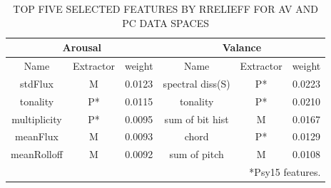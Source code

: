 \documentclass[journal, twoside]{IEEEtran}
\begin{document}
\bgroup
\def\arraystretch{1.4}
\begin{table}[ht]
    \centering
        \caption{TOP FIVE SELECTED FEATURES BY RRELIEFF FOR AV AND PC DATA SPACES}
        \label{table6}
    
    \begin{tabular}{ccc|ccc}
    \hline
\multicolumn{3}{c}{Arousal}       & \multicolumn{3}{c}{Valance}          \\ \hline
Name         & Extractor & weight & Name             & Extractor & weight \\ \hline
stdFlux      & M         & 0.0123 & spectral diss(S) & P*        & 0.0223 \\
tonality     & P*        & 0.0115 & tonality         & P*        & 0.0210 \\
multiplicity & P*        & 0.0095 & sum of bit hist  & M         & 0.0167 \\
meanFlux     & M         & 0.0093 & chord            & P*        & 0.0129 \\
meanRolloff  & M         & 0.0092 & sum of pitch     & M         & 0.0108\\ \hline \hline
 \multicolumn{6}{r}{*Psy15 features.}
\end{tabular}
\end{table}
\vspace{.5cm}
\end{document}
